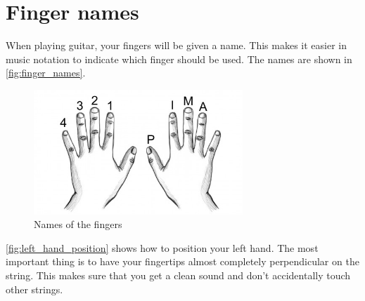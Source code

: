 \section{Finger names}

When playing guitar, your fingers will be given a name. This makes it easier in music notation to indicate which finger should be used. The names are shown in \autoref{fig:finger_names}.

\begin{figure}[h]
    \centering
    \includegraphics[width=0.7\textwidth]{../../Images/guitar-finger-tips_pima.jpg}
    \caption{Names of the fingers \cite{FingerNames}}
    \label{fig:finger_names}
\end{figure}

\autoref{fig:left_hand_position} shows how to position your left hand. The most important thing is to have your fingertips almost completely perpendicular on the string. This makes sure that you get a clean sound and don't accidentally touch other strings.

